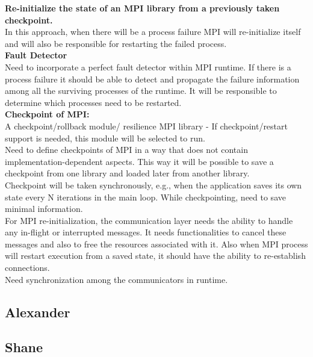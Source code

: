 \documentclass{article}
\begin{document}
\textbf{Re-initialize the state of an MPI library from a previously taken checkpoint.}\\

	In this approach, when there will be a process failure MPI will re-initialize itself and 
	will also be responsible for restarting the failed process.\\
	
	\textbf{Fault Detector}\\
	
	Need to incorporate a perfect fault detector within MPI runtime. If there is a process failure it should be able to detect and 
	propagate the failure information among all the surviving processes of the runtime. 
	It will be responsible to determine which processes need to be restarted.\\
	
	\textbf{Checkpoint of MPI:}\\
	
	A checkpoint/rollback module/ resilience MPI library - If checkpoint/restart support is needed, this module will be selected to run.\\
		
	Need to define checkpoints of MPI in a way that does not contain implementation-dependent aspects. 
	This way it will be possible to save a checkpoint from one library and loaded later from another library.\\
	
	Checkpoint will be taken synchronously, e.g., when the application saves its own state every N iterations in the main loop.
	While checkpointing, need to save minimal information.\\
	
	For MPI re-initialization, the communication layer needs the ability to handle any in-flight or interrupted messages. 
	It needs functionalities to cancel these messages and also to free the resources associated with it. 
	Also when MPI process will restart execution from a saved state, it should have the ability to re-establish connections.\\
	
	Need synchronization among the communicators in runtime.\\
	

\subsection{Alexander}

\subsection{Shane}
\end{document}
